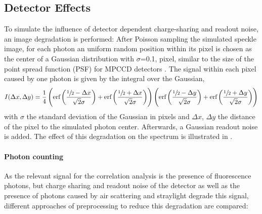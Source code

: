\subsection{Detector Effects}
\label{sec:chargesharing}
To simulate the influence of detector dependent charge-sharing and readout noise, an image degradation is performed: After Poisson sampling the simulated speckle image, for each photon an uniform random position within its pixel is chosen as the center of a Gaussian distribution with $\sigma$=0.1, pixel, similar to the size of the point spread function (PSF) for MPCCD detectors \cite{mpccd}.
The signal within each pixel caused by one photon is given by the integral over the Gaussian,
\begin{equation*}
	I(\Delta x,\Delta y)=\frac{1}{4} \left(\text{erf}\left(\frac{\sfrac{1}{2}-\Delta x}{\sqrt{2}
		\sigma}\right)+\text{erf}\left(\frac{\sfrac{1}{2}+\Delta x}{\sqrt{2} \sigma}\right)\right) \left(\text{erf}\left(\frac{\sfrac{1}{2}-\Delta y}{\sqrt{2}
		\sigma}\right)+\text{erf}\left(\frac{\sfrac{1}{2}+\Delta y}{\sqrt{2} \sigma}\right)\right)
\end{equation*}
with $\sigma$ the standard deviation of the Gaussian in pixels and $\Delta x$, $\Delta y$ the distance of the pixel to the simulated photon center. Afterwards, a Gaussian readout noise is added. The effect of this degradation on the spectrum is illustrated in .



\paragraph{Photon counting}
As the relevant signal for the correlation analysis is the presence of fluorescence photons, but charge sharing and readout noise of the detector as well as the presence of photons caused by air scattering and straylight degrade this signal, different approaches  of preprocessing to reduce this degradation are compared:

